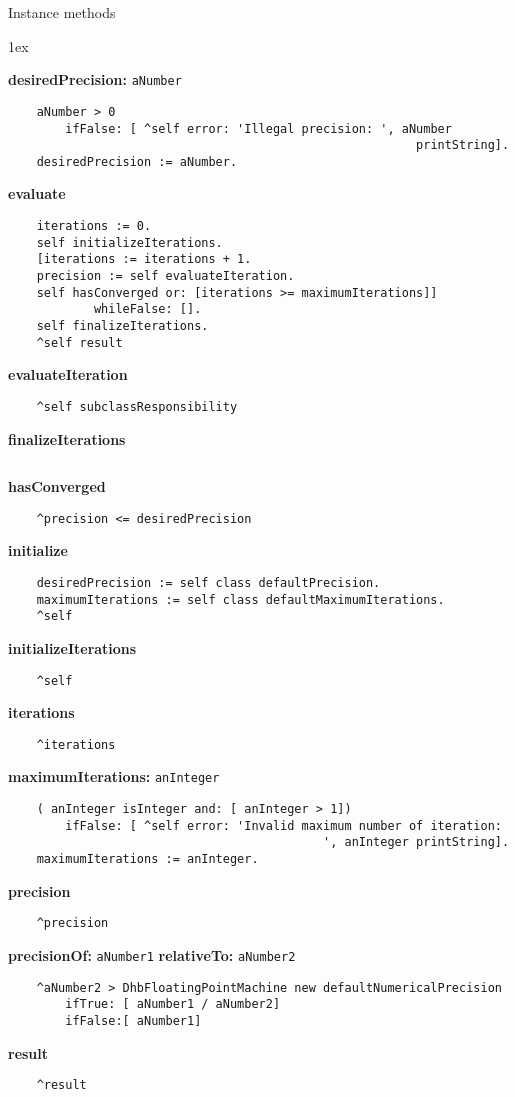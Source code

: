 Instance methods
{\parskip 1ex\par\noindent}
{\bf desiredPrecision:} {\tt aNumber}
\begin{verbatim}
    aNumber > 0
        ifFalse: [ ^self error: 'Illegal precision: ', aNumber 
                                                         printString].
    desiredPrecision := aNumber.
\end{verbatim}
{\bf evaluate}
\begin{verbatim}
    iterations := 0.
    self initializeIterations.
    [iterations := iterations + 1.
    precision := self evaluateIteration.
    self hasConverged or: [iterations >= maximumIterations]] 
            whileFalse: [].
    self finalizeIterations.
    ^self result
\end{verbatim}
{\bf evaluateIteration}
\begin{verbatim}
    ^self subclassResponsibility
\end{verbatim}
{\bf finalizeIterations}
\begin{verbatim}

\end{verbatim}
{\bf hasConverged}
\begin{verbatim}
    ^precision <= desiredPrecision
\end{verbatim}
{\bf initialize}
\begin{verbatim}
    desiredPrecision := self class defaultPrecision.
    maximumIterations := self class defaultMaximumIterations.
    ^self
\end{verbatim}
{\bf initializeIterations}
\begin{verbatim}
    ^self
\end{verbatim}
{\bf iterations}
\begin{verbatim}
    ^iterations
\end{verbatim}
{\bf maximumIterations:} {\tt anInteger}
\begin{verbatim}
    ( anInteger isInteger and: [ anInteger > 1])
        ifFalse: [ ^self error: 'Invalid maximum number of iteration: 
                                            ', anInteger printString].
    maximumIterations := anInteger.
\end{verbatim}
{\bf precision}
\begin{verbatim}
    ^precision
\end{verbatim}
{\bf precisionOf:} {\tt aNumber1} {\bf relativeTo:} {\tt aNumber2}
\begin{verbatim}
    ^aNumber2 > DhbFloatingPointMachine new defaultNumericalPrecision
        ifTrue: [ aNumber1 / aNumber2]
        ifFalse:[ aNumber1]
\end{verbatim}
{\bf result}
\begin{verbatim}
    ^result
\end{verbatim}

